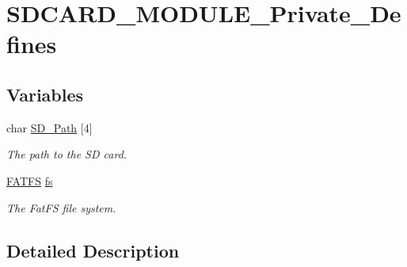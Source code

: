 \hypertarget{group___s_d_c_a_r_d___m_o_d_u_l_e___private___defines}{}\section{S\+D\+C\+A\+R\+D\+\_\+\+M\+O\+D\+U\+L\+E\+\_\+\+Private\+\_\+\+Defines}
\label{group___s_d_c_a_r_d___m_o_d_u_l_e___private___defines}
\subsection*{Variables}
\begin{DoxyCompactItemize}
\item 
\mbox{\label{group___s_d_c_a_r_d___m_o_d_u_l_e___private___defines_ga37efc360033863352a8678e12c56d977}} 
char \hyperlink{group___s_d_c_a_r_d___m_o_d_u_l_e___private___defines_ga37efc360033863352a8678e12c56d977}{S\+D\+\_\+\+Path} \mbox{[}4\mbox{]}
\begin{DoxyCompactList}\small\item\em The path to the SD card. \end{DoxyCompactList}\item 
\mbox{\label{group___s_d_c_a_r_d___m_o_d_u_l_e___private___defines_gae5bcde72e0e0b29ec86d00ba3e5cd51f}} 
\hyperlink{struct_f_a_t_f_s}{F\+A\+T\+FS} \hyperlink{group___s_d_c_a_r_d___m_o_d_u_l_e___private___defines_gae5bcde72e0e0b29ec86d00ba3e5cd51f}{fs}
\begin{DoxyCompactList}\small\item\em The Fat\+FS file system. \end{DoxyCompactList}\end{DoxyCompactItemize}


\subsection{Detailed Description}
